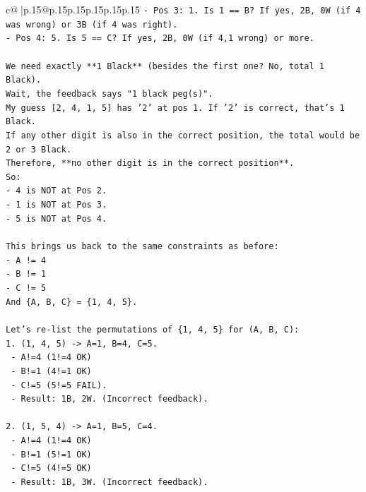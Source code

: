 \documentclass{article}
\begin{document}
{\begin{supertabular}{c@{$\;$}|p{.15\linewidth}@{}p{.15\linewidth}p{.15\linewidth}p{.15\linewidth}p{.15\linewidth}p{.15\linewidth}}
{{{\texttt{{-} Pos 3: 1. Is 1 == B? If yes, 2B, 0W (if 4 was wrong) or 3B (if 4 was right).} \\
\texttt{{-} Pos 4: 5. Is 5 == C? If yes, 2B, 0W (if 4,1 wrong) or more.} \\
\\ 
\texttt{We need exactly **1 Black** (besides the first one? No, total 1 Black).} \\
\texttt{Wait, the feedback says "1 black peg(s)".} \\
\texttt{My guess {[}2, 4, 1, 5{]} has '2' at pos 1. If '2' is correct, that's 1 Black.} \\
\texttt{If any other digit is also in the correct position, the total would be 2 or 3 Black.} \\
\texttt{Therefore, **no other digit is in the correct position**.} \\
\texttt{So:} \\
\texttt{{-} 4 is NOT at Pos 2.} \\
\texttt{{-} 1 is NOT at Pos 3.} \\
\texttt{{-} 5 is NOT at Pos 4.} \\
\\ 
\texttt{This brings us back to the same constraints as before:} \\
\texttt{{-} A != 4} \\
\texttt{{-} B != 1} \\
\texttt{{-} C != 5} \\
\texttt{And \{A, B, C\} = \{1, 4, 5\}.} \\
\\ 
\texttt{Let's re{-}list the permutations of \{1, 4, 5\} for (A, B, C):} \\
\texttt{1. (1, 4, 5) {-}> A=1, B=4, C=5.} \\
\texttt{   {-} A!=4 (1!=4 OK)} \\
\texttt{   {-} B!=1 (4!=1 OK)} \\
\texttt{   {-} C!=5 (5!=5 FAIL).} \\
\texttt{   {-} Result: 1B, 2W. (Incorrect feedback).} \\
\\ 
\texttt{2. (1, 5, 4) {-}> A=1, B=5, C=4.} \\
\texttt{   {-} A!=4 (1!=4 OK)} \\
\texttt{   {-} B!=1 (5!=1 OK)} \\
\texttt{   {-} C!=5 (4!=5 OK)} \\
\texttt{   {-} Result: 1B, 3W. (Incorrect feedback).} \\
}}}
\end{supertabular}}
\end{document}
